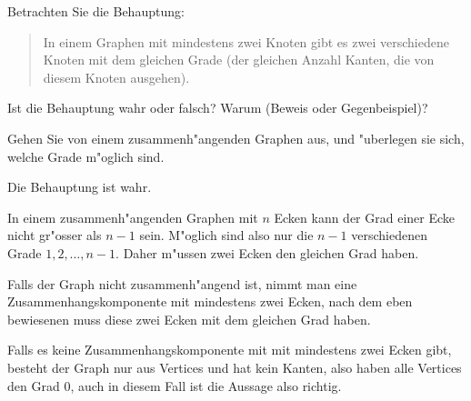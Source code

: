 Betrachten Sie die Behauptung:
\begin{quote}
In einem Graphen mit mindestens zwei Knoten gibt es zwei verschiedene Knoten
mit dem gleichen Grade (der gleichen Anzahl Kanten, die von diesem
Knoten ausgehen).
\end{quote}
Ist die Behauptung wahr oder falsch? Warum (Beweis
oder Gegenbeispiel)?

\begin{hinweis}
Gehen Sie von einem zusammenh"angenden Graphen
aus, und "uberlegen sie sich, welche Grade m"oglich sind.
\end{hinweis}

\begin{loesung}
Die Behauptung ist wahr.

In einem zusammenh"angenden Graphen mit $n$
Ecken kann der Grad einer Ecke nicht gr"osser als $n-1$ sein.
M"oglich sind also nur die $n-1$ verschiedenen Grade
$1,2,\dots,n-1$. Daher m"ussen zwei Ecken den gleichen Grad
haben.

Falls der Graph nicht zusammenh"angend ist, nimmt man eine
Zusammenhangskomponente mit mindestens zwei Ecken, nach dem
eben bewiesenen muss diese zwei Ecken mit dem gleichen
Grad haben.

Falls es keine Zusammenhangskomponente mit mit mindestens
zwei Ecken gibt, besteht der Graph nur aus Vertices und hat
kein Kanten, also haben alle Vertices den Grad $0$, auch
in diesem Fall ist die Aussage also richtig.
\end{loesung}
